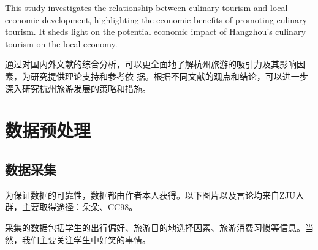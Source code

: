 \documentclass[a4paper,12pt]{article}
\begin{document}
This study investigates the relationship between 
culinary tourism and local economic development, highlighting the economic benefits of promoting culinary tourism. It sheds light on the potential economic impact of Hangzhou's culinary tourism on the local economy.

通过对国内外文献的综合分析，可以更全面地了解杭州旅游的吸引力及其影响因素，为研究提供理论支持和参考依
据。根据不同文献的观点和结论，可以进一步深入研究杭州旅游发展的策略和措施。



\section{数据预处理}
\subsection{数据采集}
为保证数据的可靠性，数据都由作者本人获得。以下图片以及言论均来自ZJU人群，主要取得途径：朵朵、CC98。

采集的数据包括学生的出行偏好、旅游目的地选择因素、旅游消费习惯等信息。当然，我们主要关注学生中好笑的事情。
\end{document}
